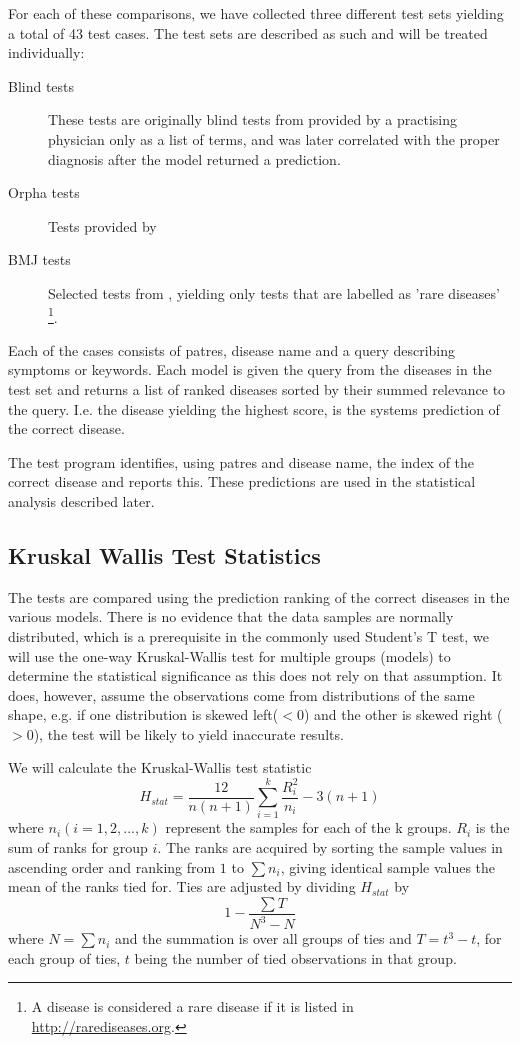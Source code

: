 \documentclass[10pt,letterpaper,final]{article}
\begin{document}
For each of these comparisons, we have collected three different test
sets yielding a total of 43 test cases. The test sets are described as
such and will be treated individually:
\begin{description}
\item[Blind tests] These tests are originally blind tests from
\cite{jensenandersen} provided by a practising physician only as a list
of terms, and was later correlated with the proper diagnosis after the
model returned a prediction.
\item[Orpha tests] Tests provided by 
\item[BMJ tests] Selected tests from \cite{googlingdiagnosis}, yielding
only tests that are labelled as 'rare diseases' \footnote{A disease is
considered a rare disease if it is listed in
\url{http://rarediseases.org}.}.
\end{description}

Each of the cases consists of patres, disease name and a query
describing symptoms or keywords. Each model is given the query from the
diseases in the test set and returns a list of ranked diseases sorted by
their summed relevance to the query. I.e. the disease yielding the
highest score, is the systems prediction of the correct disease.

The test program identifies, using patres and disease name, the index
of the correct disease and reports this. These predictions are used in
the statistical analysis described later.


\subsection{Kruskal Wallis Test Statistics}
The tests are compared using the prediction ranking of the correct
diseases in the various models. There is no evidence that the data
samples are normally distributed, which is a prerequisite in the
commonly used Student's T test, we will use the one-way Kruskal-Wallis
\cite{kruskalwallis} test for multiple groups (models) to determine the
statistical significance as this does not rely on that assumption. It
does, however, assume the observations come from distributions of the
same shape, e.g. if one distribution is skewed left($<0$) and the other
is skewed right ($>0$), the test will be likely to yield inaccurate
results.

We will calculate the Kruskal-Wallis test statistic
\[
H_{stat} = \frac{12}{n(n+1)}\sum\limits_{i = 1}^{k} \frac{R^{2}_{i}}{n_{i}} - 3(n+1)
\]
where $n_{i} (i = 1, 2, ..., k)$ represent the samples for each of the k
groups. $R_{i}$ is the sum of ranks for group $i$. The ranks are
acquired by sorting the sample values in ascending order and ranking
from $1$ to $\sum n_{i}$, giving identical sample values the mean of the
ranks tied for. Ties are adjusted by dividing $H_{stat}$ by
\[
1 - \frac{\sum T}{N^3-N}
\]
where $N = \sum n_{i}$ and the summation is over all groups of ties and
$T = t^3-t$, for each group of ties, $t$ being the number of tied
observations in that group.
\end{document}

